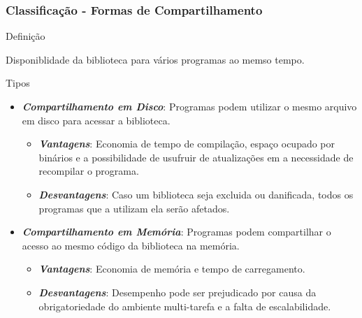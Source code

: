 \begin{frame}
 \frametitle{Classificação - Formas de Compartilhamento}

 \begin{block}{Definição}

  Disponiblidade da biblioteca para vários programas ao memso tempo.

 \end{block}

 \begin{block}{Tipos}

  \begin{itemize}

   \item \emph{\textbf{Compartilhamento em Disco}}: Programas podem utilizar o mesmo arquivo em disco para acessar a
   biblioteca.

   \begin{itemize}

     \item \emph{\textbf{Vantagens}}: Economia de tempo de compilação, espaço ocupado por binários e a possibilidade
     de usufruir de atualizações em a necessidade de recompilar o programa.


     \item \emph{\textbf{Desvantagens}}: Caso um biblioteca seja excluida ou danificada, todos os programas que a utilizam
     ela serão afetados.

   \end{itemize}

   \item \emph{\textbf{Compartilhamento em Memória}}: Programas podem compartilhar o acesso ao mesmo
   código da biblioteca na memória.

   \begin{itemize}

     \item \emph{\textbf{Vantagens}}: Economia de memória e tempo de carregamento.


     \item \emph{\textbf{Desvantagens}}: Desempenho pode ser prejudicado por causa da obrigatoriedade do ambiente
     multi-tarefa e a falta de escalabilidade.


   \end{itemize}

  \end{itemize}

 \end{block}

\end{frame}
